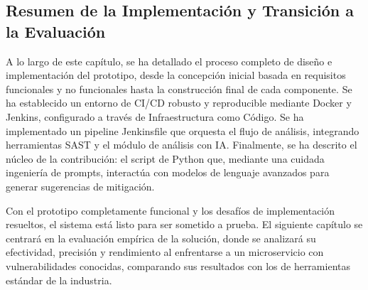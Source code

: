 \subsection{Resumen de la Implementación y Transición a la Evaluación}
A lo largo de este capítulo, se ha detallado el proceso completo de diseño e implementación del prototipo, desde la concepción inicial basada en requisitos funcionales y no funcionales hasta la construcción final de cada componente. Se ha establecido un entorno de CI/CD robusto y reproducible mediante Docker y Jenkins, configurado a través de Infraestructura como Código. Se ha implementado un pipeline Jenkinsfile que orquesta el flujo de análisis, integrando herramientas SAST y el módulo de análisis con IA. Finalmente, se ha descrito el núcleo de la contribución: el script de Python que, mediante una cuidada ingeniería de prompts, interactúa con modelos de lenguaje avanzados para generar sugerencias de mitigación.

Con el prototipo completamente funcional y los desafíos de implementación resueltos, el sistema está listo para ser sometido a prueba. El siguiente capítulo se centrará en la evaluación empírica de la solución, donde se analizará su efectividad, precisión y rendimiento al enfrentarse a un microservicio con vulnerabilidades conocidas, comparando sus resultados con los de herramientas estándar de la industria.

